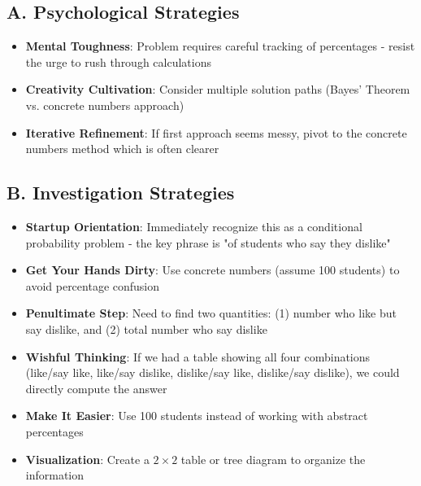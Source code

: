 \documentclass[]{article}
\begin{document}
\begin{strategicbox}
\subsection*{A. Psychological Strategies}
\begin{itemize}[leftmargin=*]
    \item \textbf{Mental Toughness}: Problem requires careful tracking of percentages - resist the urge to rush through calculations
    
    \item \textbf{Creativity Cultivation}: Consider multiple solution paths (Bayes' Theorem vs. concrete numbers approach)
    
    \item \textbf{Iterative Refinement}: If first approach seems messy, pivot to the concrete numbers method which is often clearer
\end{itemize}

\subsection*{B. Investigation Strategies}
\begin{itemize}[leftmargin=*]
    \item \textbf{Startup Orientation}: Immediately recognize this as a conditional probability problem - the key phrase is "of students who say they dislike"
    
    \item \textbf{Get Your Hands Dirty}: Use concrete numbers (assume 100 students) to avoid percentage confusion
    
    \item \textbf{Penultimate Step}: Need to find two quantities: (1) number who like but say dislike, and (2) total number who say dislike
    
    \item \textbf{Wishful Thinking}: If we had a table showing all four combinations (like/say like, like/say dislike, dislike/say like, dislike/say dislike), we could directly compute the answer
    
    \item \textbf{Make It Easier}: Use 100 students instead of working with abstract percentages
    
    \item \textbf{Visualization}: Create a $2 \times 2$ table or tree diagram to organize the information
\end{itemize}


\end{strategicbox}
\end{document}

